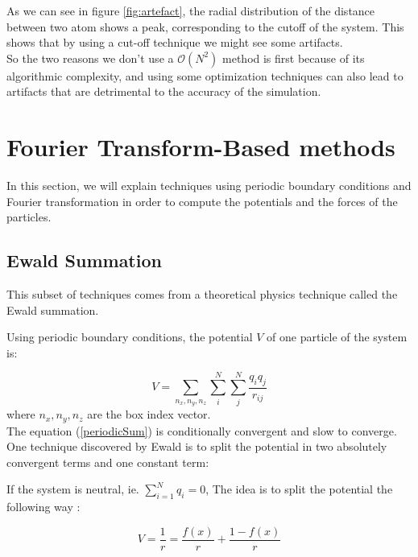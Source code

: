 \documentclass[10pt,twoside,a4paper]{report}
\begin{document}
As we can see in figure \ref{fig:artefact},  the radial distribution of the distance between two atom shows a peak, corresponding to the cutoff of the system. This shows that by using a cut-off technique we might see some artifacts.\\

So the two reasons we don't use a $\mathcal{O}(N^2)$ method is first because of its algorithmic complexity, and using some optimization techniques can also lead to artifacts that are detrimental to the accuracy of the simulation.





\section{Fourier Transform-Based methods}

In this section, we will explain techniques using periodic boundary conditions and Fourier transformation in order to compute the potentials and the forces of the particles.

\subsection{Ewald Summation}

This subset of techniques comes from a theoretical physics technique called the Ewald summation.

Using periodic boundary conditions, the potential $V$ of one particle of the system is:

\begin{equation}
	V = \sum_{n_x,n_y,n_z} \sum_{i}^{N} \sum_{j}^{N} \frac{q_i q_j}{r_{ij}}
	\label{periodicSum}
\end{equation}
where $n_x,n_y,n_z$ are the box index vector.\\

The equation (\ref{periodicSum}) is conditionally convergent and slow to converge. One technique discovered by Ewald is to split the potential in two absolutely convergent terms and one constant term:


If the system is neutral, ie. $\sum_{i=1}^N q_i = 0$, The idea is to split the potential the following way :

\begin{equation}
    V = \frac{1}{r} = \frac{f(x)}{r} + \frac{1 - f(x)}{r}
\end{equation}
\end{document}
